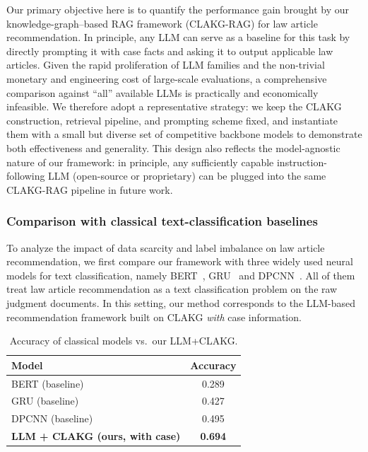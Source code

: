 \documentclass[review,times,nonatbib]{elsarticle} %
\renewcommand{\textcolor}[2]{#2}
\begin{document}
\textcolor{blue}{Our primary objective here is to quantify the performance gain brought by our knowledge-graph--based RAG framework (CLAKG-RAG) for law article recommendation. In principle, any LLM can serve as a baseline for this task by directly prompting it with case facts and asking it to output applicable law articles. Given the rapid proliferation of LLM families and the non-trivial monetary and engineering cost of large-scale evaluations, a comprehensive comparison against ``all'' available LLMs is practically and economically infeasible. We therefore adopt a representative strategy: we keep the CLAKG construction, retrieval pipeline, and prompting scheme fixed, and instantiate them with a small but diverse set of competitive backbone models to demonstrate both effectiveness and generality. This design also reflects the model-agnostic nature of our framework: in principle, any sufficiently capable instruction-following LLM (open-source or proprietary) can be plugged into the same CLAKG-RAG pipeline in future work.}



\subsubsection{Comparison with classical text-classification baselines}

To analyze the impact of data scarcity and label imbalance on law article recommendation, we first compare our framework with three widely used neural models for text classification, namely BERT~\cite{devlin2019bert}, GRU~\cite{cho2014learning} and DPCNN~\cite{johnson2017deep}. All of them treat law article recommendation as a text classification problem on the raw judgment documents. In this setting, our method corresponds to the LLM-based recommendation framework built on CLAKG \emph{with} case information.

\begin{table}[h!]
\centering
\caption{Accuracy of classical models vs.\ our LLM+CLAKG.}
\begin{tabular}{l|c}
\hline
\textbf{Model} & \textbf{Accuracy} \\ \hline
BERT (baseline) & 0.289 \\ \hline
GRU (baseline) & 0.427 \\ \hline
DPCNN (baseline) & 0.495 \\ \hline
\textbf{LLM + CLAKG (ours, with case)} & \textbf{0.694} \\ \hline
\end{tabular}
\label{table:model_accuracy1}
\end{table}
\end{document}
